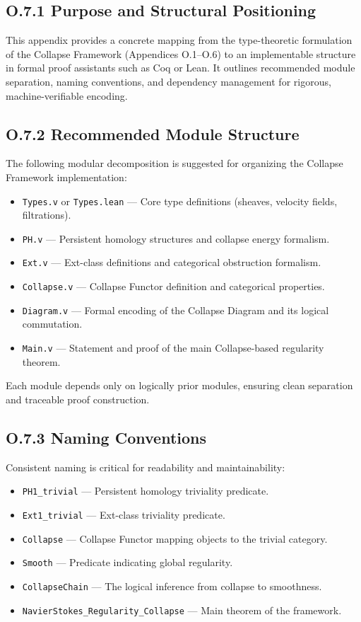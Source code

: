 \documentclass[11pt]{article}
\begin{document}
\subsection*{O.7.1 Purpose and Structural Positioning}

This appendix provides a concrete mapping from the type-theoretic formulation of the Collapse Framework (Appendices O.1–O.6) to an implementable structure in formal proof assistants such as Coq or Lean.  
It outlines recommended module separation, naming conventions, and dependency management for rigorous, machine-verifiable encoding.

\subsection*{O.7.2 Recommended Module Structure}

The following modular decomposition is suggested for organizing the Collapse Framework implementation:

\begin{itemize}
  \item \texttt{Types.v} or \texttt{Types.lean} — Core type definitions (sheaves, velocity fields, filtrations).
  \item \texttt{PH.v} — Persistent homology structures and collapse energy formalism.
  \item \texttt{Ext.v} — Ext-class definitions and categorical obstruction formalism.
  \item \texttt{Collapse.v} — Collapse Functor definition and categorical properties.
  \item \texttt{Diagram.v} — Formal encoding of the Collapse Diagram and its logical commutation.
  \item \texttt{Main.v} — Statement and proof of the main Collapse-based regularity theorem.
\end{itemize}

Each module depends only on logically prior modules, ensuring clean separation and traceable proof construction.

\subsection*{O.7.3 Naming Conventions}

Consistent naming is critical for readability and maintainability:

\begin{itemize}
  \item \texttt{PH1\_trivial} — Persistent homology triviality predicate.
  \item \texttt{Ext1\_trivial} — Ext-class triviality predicate.
  \item \texttt{Collapse} — Collapse Functor mapping objects to the trivial category.
  \item \texttt{Smooth} — Predicate indicating global regularity.
  \item \texttt{CollapseChain} — The logical inference from collapse to smoothness.
  \item \texttt{NavierStokes\_Regularity\_Collapse} — Main theorem of the framework.
\end{itemize}
\end{document}
